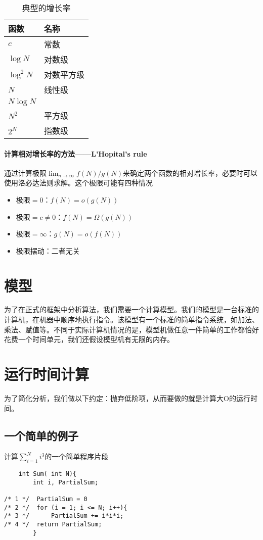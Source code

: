 \documentclass[utf8]{ctexbook}
\begin{document}
\begin{table}[h]
\centering 
\begin{tabular}{l|l}
    函数 & 名称\\\hline
    $c$ & 常数\\
    $\log N$ & 对数级\\ 
    $\log ^2 N$ & 对数平方级\\
    $N$ & 线性级\\
    $N\log N$& \\
    $N^2$& 平方级\\ 
    $2^N$ & 指数级
\end{tabular}
\caption{典型的增长率}
\end{table}
\paragraph{计算相对增长率的方法——L'Hopital's rule}
通过计算极限$\displaystyle{\lim_{ n \to \infty}f(N)/g(N)}$来确定两个函数的相对增长率，必要时可以使用洛必达法则求解。这个极限可能有四种情况
\begin{itemize}
    \item 极限$=0$：$f(N) = o(g(N))$
    \item 极限$=c\ne0$：$f(N) = \Omega (g(N))$
    \item 极限$ = \infty$：$g(N) = o(f(N))$
    \item 极限摆动：二者无关
\end{itemize}

\section{模型}
为了在正式的框架中分析算法，我们需要一个计算模型。我们的模型是一台标准的计算机，在机器中顺序地执行指令。该模型有一个标准的简单指令系统，如加法、乘法、赋值等。不同于实际计算机情况的是，模型机做任意一件简单的工作都恰好花费一个时间单元，我们还假设模型机有无限的内存。
\section{运行时间计算}
为了简化分析，我们做以下约定：抛弃低阶项，从而要做的就是计算大O的运行时间。
\subsection{一个简单的例子}
计算$\displaystyle \sum_{i = 1}^{N} i^3 的一个简单程序片段$
\newline

\begin{lstlisting}
    int Sum( int N){
        int i, PartialSum;

/* 1 */  PartialSum = 0
/* 2 */  for (i = 1; i <= N; i++){
/* 3 */      PartialSum += i*i*i;
/* 4 */  return PartialSum;
        }
\end{lstlisting}
\end{document}
